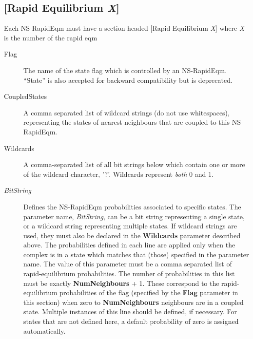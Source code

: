 \subsection{[Rapid Equilibrium \emph{X}]}
Each NS-RapidEqm must have a section headed [Rapid Equilibrium
\emph{X}] where \emph{X} is the number of the rapid eqm
\begin{description}
\item[Flag] The name of the state flag which is controlled by an
NS-RapidEqm. ``State'' is also accepted for backward compatibility but
  is deprecated.
  
\item[CoupledStates] A comma separated list of wildcard strings (do
not use whitespaces), representing the states of nearest neighbours
that are coupled to this NS-RapidEqm.

\item[Wildcards] A comma-separated list of all bit strings below which
  contain one or more of the wildcard character, '?'. Wildcards
  represent \emph{both} 0 and 1.
  
\item[\emph{BitString}] Defines the NS-RapidEqm probabilities
  associated to specific states.  The parameter name,
  \emph{BitString}, can be a bit string representing a single state,
  or a wildcard string representing multiple states.  If wildcard
  strings are used, they must also be declared in the
  \textbf{Wildcards} parameter described above.  The probabilities
  defined in each line are applied only when the complex is in a state
  which matches that (those) specified in the parameter name.  The
  value of this parameter must be a comma separated list of
  rapid-equilibrium probabilities.  The number of probabilities in
  this list must be exactly \textbf{NumNeighbours} + 1. These
  correspond to the rapid-equilibrium probabilities of the flag
  (specified by the \textbf{Flag} parameter in this section) when
  zero to \textbf{NumNeighbours} neighbours are in a coupled state.
  Multiple instances of this line should be defined, if necessary.
  For states that are not defined here, a default probability of zero
  is assigned automatically.
\end{description}

